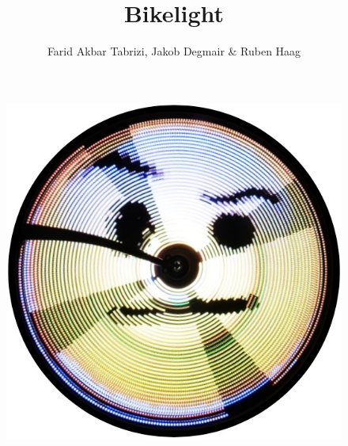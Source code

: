 \documentclass [a4paper, 11pt] {article}
\title{Bikelight}
\author{Farid Akbar Tabrizi, Jakob Degmair \& Ruben Haag}
\date{}
\begin{document}
\maketitle
\begin{figure}[H]
\centering
\includegraphics[width=16.0cm]{Smily3.png}
\end{figure}
\newpage
\tableofcontents
\newpage
\setlength{\parindent}{0pt}
\end{document}
